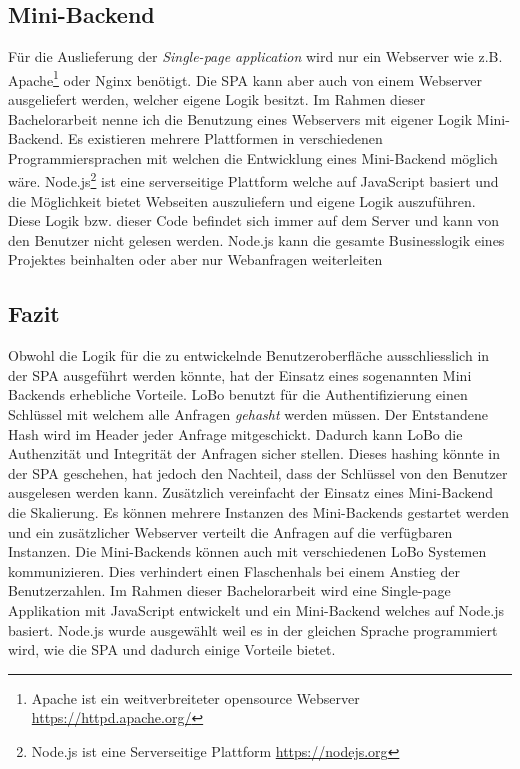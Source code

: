 \subsection{Mini-Backend}
Für die Auslieferung der \textit{Single-page application} wird nur ein Webserver wie z.B. Apache\footnote{Apache ist ein weitverbreiteter opensource Webserver \url{https://httpd.apache.org/}} oder Nginx benötigt. Die SPA kann aber auch von einem Webserver ausgeliefert werden, welcher eigene Logik besitzt. Im Rahmen dieser Bachelorarbeit nenne ich die Benutzung eines Webservers mit eigener Logik Mini-Backend. Es existieren mehrere Plattformen in verschiedenen Programmiersprachen mit welchen die Entwicklung eines Mini-Backend möglich wäre.  Node.js\footnote{Node.js ist eine Serverseitige Plattform \url{https://nodejs.org}} ist eine serverseitige Plattform welche auf JavaScript basiert und die Möglichkeit bietet Webseiten auszuliefern und eigene Logik auszuführen. Diese Logik bzw. dieser Code befindet sich immer auf dem Server und kann von den Benutzer nicht gelesen werden. Node.js kann die gesamte Businesslogik eines Projektes beinhalten oder aber nur Webanfragen weiterleiten

\subsection{Fazit}
Obwohl die Logik für die zu entwickelnde Benutzeroberfläche ausschliesslich in der SPA ausgeführt werden könnte, hat der Einsatz eines sogenannten Mini Backends erhebliche Vorteile. LoBo benutzt für die Authentifizierung einen Schlüssel mit welchem alle Anfragen \textit{gehasht} werden müssen. Der Entstandene Hash wird im Header jeder Anfrage mitgeschickt. Dadurch kann LoBo die Authenzität und Integrität der Anfragen sicher stellen. Dieses hashing könnte in der SPA geschehen, hat jedoch den Nachteil, dass der Schlüssel von den Benutzer ausgelesen werden kann. Zusätzlich vereinfacht der Einsatz eines Mini-Backend die Skalierung. Es können mehrere Instanzen des Mini-Backends gestartet werden und ein zusätzlicher Webserver verteilt die Anfragen auf die verfügbaren Instanzen. Die Mini-Backends können auch mit verschiedenen LoBo Systemen kommunizieren. Dies verhindert einen Flaschenhals bei einem Anstieg der Benutzerzahlen. Im Rahmen dieser Bachelorarbeit wird eine Single-page Applikation mit JavaScript entwickelt und ein Mini-Backend welches auf Node.js basiert. Node.js wurde ausgewählt weil es in der gleichen Sprache programmiert wird, wie die SPA und dadurch einige Vorteile bietet.

